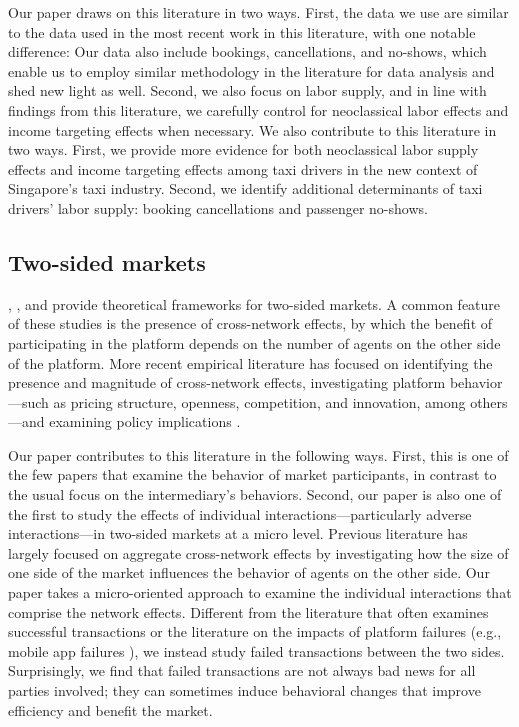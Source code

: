 \documentclass[reviewmode]{AEA}
\begin{document}
Our paper draws on this literature in two ways. First, the data we use are similar to the data used in the most recent work in this literature, with one notable difference: Our data also include bookings, cancellations, and no-shows, which enable us to employ similar methodology in the literature for data analysis and shed new light as well. Second, we also focus on labor supply, and in line with findings from this literature, we carefully control for neoclassical labor effects and income targeting effects when necessary. We also contribute to this literature in two ways. First, we provide more evidence for both neoclassical labor supply effects and income targeting effects among taxi drivers in the new context of Singapore's taxi industry. Second, we identify  additional determinants of taxi drivers' labor supply: booking cancellations and passenger no-shows.

\subsection{Two-sided markets}

\citet{armstrong2006competition}, \citet{caillaud2001competing,caillaud2003chicken}, and \citet{rochet2003platform,rochet2006two} provide theoretical frameworks for two-sided markets. A common feature of these studies is the presence of cross-network effects, by which the benefit of participating in the platform depends on the number of agents on the other side of the platform. More recent empirical literature has focused on identifying the presence and magnitude of cross-network effects, investigating platform behavior---such as pricing structure, openness, competition, and innovation, among others---and examining policy implications \citep{rysman2009economics, sriram2015platforms}.

Our paper contributes to this literature in the following ways.  First, this is one of the few papers that examine the behavior of market participants, in contrast to the usual focus on the intermediary's behaviors. 
Second, our paper is also one of the first to study the effects of individual interactions---particularly adverse interactions---in two-sided markets at a micro level. Previous literature has largely focused on aggregate cross-network effects by investigating how the size of one side of the market influences the behavior of agents on the other side. Our paper takes a micro-oriented approach to examine the individual interactions that comprise the network effects. Different from the literature that often  examines successful transactions \citep{zhang2017meet,lin2015home,chintagunta2017quantifying,dai2018multistep} or the literature on the impacts of platform failures (e.g., mobile app failures \citep{narang2018impact}), we instead study failed transactions between the two sides. Surprisingly, we find that failed transactions are not always bad news for all parties involved; they can sometimes induce behavioral changes that improve efficiency and benefit the market.
\end{document}
